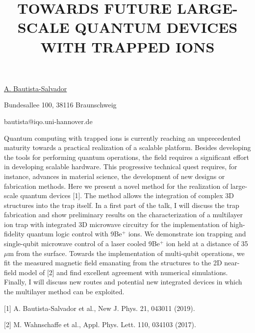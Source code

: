 \title{TOWARDS FUTURE LARGE-SCALE QUANTUM DEVICES WITH TRAPPED IONS}

\underline{A. Bautista-Salvador}  

{\normalsize{\vspace{-4mm}
Bundesallee 100, 38116 Braunschweig



\email bautista@iqo.uni-hannover.de}}

Quantum computing with trapped ions is currently reaching an unprecedented maturity towards a practical realization of a scalable platform. Besides developing the tools for performing quantum operations, the field requires a significant effort in developing scalable hardware. This progressive technical quest requires, for instance, advances in material science, the development of new designs or fabrication methods. Here we present a novel method for the realization of large-scale quantum devices [1]. The method allows the integration of complex 3D structures into the trap itself. In a first part of the talk, I will discuss the trap fabrication and show preliminary results on the characterization of a multilayer ion trap with integrated 3D microwave circuitry for the implementation of high-fidelity quantum logic control with 9Be$^+$ ions. We demonstrate ion trapping and single-qubit microwave control of a laser cooled 9Be$^+$ ion held at a distance of 35 $\mu$m from the surface. Towards the implementation of multi-qubit operations, we fit the measured magnetic field emanating from the structures to the 2D near-field model of [2] and find excellent agreement with numerical simulations. Finally, I will discuss new routes and potential new integrated devices in which the multilayer method can be exploited.

{\normalsize
[1] A. Bautista-Salvador et al., New J. Phys. 21, 043011 (2019).
\vsp

[2] M. Wahnschaffe et al., Appl. Phys. Lett. 110, 034103 (2017).
}

\vspace{\baselineskip}